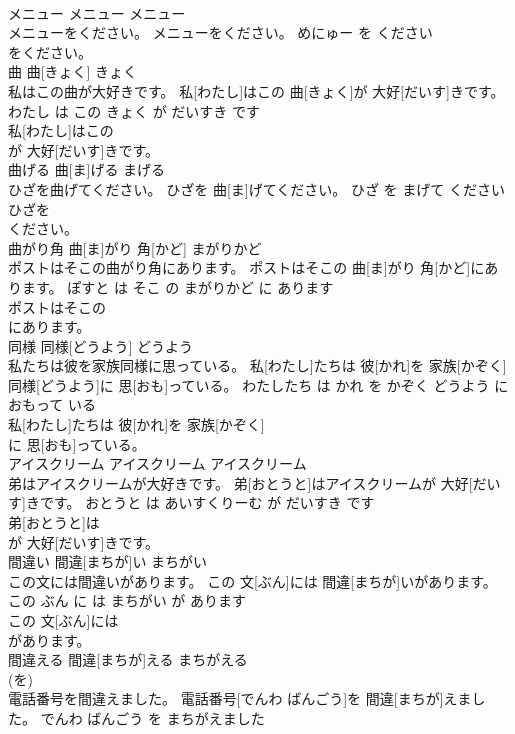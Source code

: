 \documentclass[8pt]{extreport}
\begin{document}
\begin{CJK}{UTF8}{min}
\\	メニュー	メニュー	メニュー	
\\	メニューをください。	メニューをください。	めにゅー を ください	
\\	をください。		
\\	曲	曲[きょく]	きょく	
\\	私はこの曲が大好きです。	私[わたし]はこの 曲[きょく]が 大好[だいす]きです。	わたし は この きょく が だいすき です	
\\	私[わたし]はこの
\\	が 大好[だいす]きです。		
\\	曲げる	曲[ま]げる	まげる	
\\	ひざを曲げてください。	ひざを 曲[ま]げてください。	ひざ を まげて ください	
\\	ひざを
\\	ください。		
\\	曲がり角	曲[ま]がり 角[かど]	まがりかど	
\\	ポストはそこの曲がり角にあります。	ポストはそこの 曲[ま]がり 角[かど]にあります。	ぽすと は そこ の まがりかど に あります	
\\	ポストはそこの
\\	にあります。		
\\	同様	同様[どうよう]	どうよう	
\\	私たちは彼を家族同様に思っている。	私[わたし]たちは 彼[かれ]を 家族[かぞく] 同様[どうよう]に 思[おも]っている。	わたしたち は かれ を かぞく どうよう に おもって いる	
\\	私[わたし]たちは 彼[かれ]を 家族[かぞく]
\\	に 思[おも]っている。		
\\	アイスクリーム	アイスクリーム	アイスクリーム	
\\	弟はアイスクリームが大好きです。	弟[おとうと]はアイスクリームが 大好[だいす]きです。	おとうと は あいすくりーむ が だいすき です	
\\	弟[おとうと]は
\\	が 大好[だいす]きです。		
\\	間違い	間違[まちが]い	まちがい	
\\	この文には間違いがあります。	この 文[ぶん]には 間違[まちが]いがあります。	この ぶん に は まちがい が あります	
\\	この 文[ぶん]には
\\	があります。		
\\	間違える	間違[まちが]える	まちがえる	
\\	(を)		
\\	電話番号を間違えました。	電話番号[でんわ ばんごう]を 間違[まちが]えました。	でんわ ばんごう を まちがえました	

\end{CJK}
\end{document}
